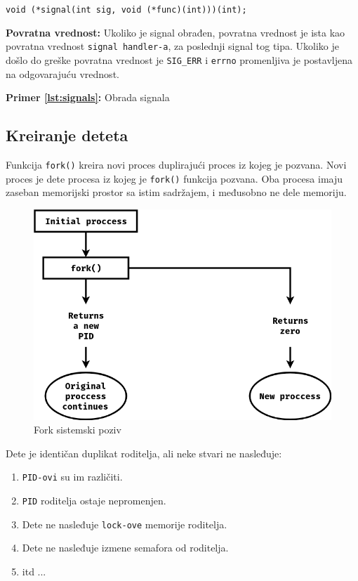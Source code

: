 \documentclass[a4paper, 11pt, twoside]{article}
\newcommand{\scode}[3] {
	\hspace{.06\textwidth} 
	\begin{minipage}[t]{.88\textwidth} %
		\begin{mdframed}[topline=true,bottomline=true,leftline=true,rightline=true,backgroundcolor=gray!22, linecolor=gray!60!black,roundcorner=1mm]
			 

	\begin{center}
		\caption{\textbf{Primer \ref{lst:#3}:} #2}
	\end{center}
	\end{mdframed}
	\end{minipage}

}
\begin{document}
\begin{center}
	\texttt{void (*signal(int sig, void (*func)(int)))(int);}
\end{center}

\textbf{Povratna vrednost:} Ukoliko je signal obrađen, povratna vrednost je ista kao povratna vrednost \texttt{signal handler-a}, za poslednji signal tog tipa. Ukoliko je došlo do greške povratna vrednost je \texttt{SIG\_ERR} i \texttt{errno} promenljiva je postavljena na odgovarajuću vrednost.

\scode{signals.c}{Obrada signala}{signals}

\newpage
\subsection{Kreiranje deteta}

Funkcija \texttt{fork()} kreira novi proces duplirajući proces iz kojeg je pozvana. Novi proces je dete procesa iz kojeg je \texttt{fork()} funkcija pozvana. Oba procesa imaju zaseban memorijski prostor sa istim sadržajem, i međusobno ne dele memoriju.

\vspace{2mm} 
\begin{figure}[h]
	\centering
	\includegraphics[width=.48\textwidth]{fsc.png} %
	\caption{Fork sistemski poziv}
	\label{fig:fsc}
\end{figure}
\vspace{2mm} 

Dete je identičan duplikat roditelja, ali neke stvari ne nasleđuje:
\vspace{-3mm} 
\begin{enumerate}[1)]
	\item{\texttt{PID-ovi} su im različiti.}
	\item{\texttt{PID} roditelja ostaje nepromenjen.}
	\item{Dete ne nasleđuje \texttt{lock-ove} memorije roditelja.}
	 \item{Dete ne nasleđuje izmene semafora od roditelja.}
	 \item[]{itd ...}
\end{enumerate}
\end{document}

